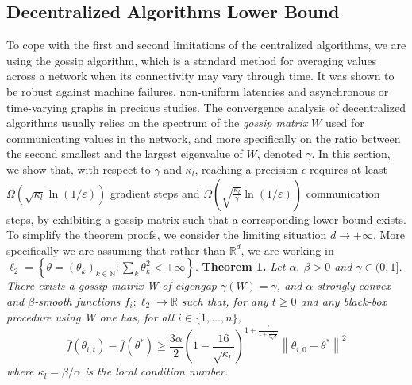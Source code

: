 \documentclass[12pt]{article}
\begin{document}
\subsection{Decentralized Algorithms Lower Bound}
To cope with the first and second limitations of the centralized algorithms, we are using the gossip algorithm, which is a standard method for averaging values across a network when its connectivity may vary through time. It was shown to be robust against machine failures, non-uniform latencies and asynchronous or time-varying graphs in precious studies. 
\newline
\newline
The convergence analysis of decentralized algorithms usually relies on the spectrum of the  \textit{gossip matrix} $W$ used for communicating values in the network, and more specifically on the ratio between the second smallest and the largest eigenvalue of $W$, denoted $\gamma$. In this section, we show that, with respect to $\gamma$ and $\kappa_l$, reaching a precision $\epsilon$ requires at least $\Omega\left(\sqrt{\kappa_{l}} \ln (1 / \varepsilon)\right)$ gradient steps
and $\Omega\left(\sqrt{\frac{\kappa_{l}}{\gamma}} \ln (1 / \varepsilon)\right)$ communication steps, by exhibiting a gossip matrix such that a corresponding lower bound exists.
\newline
\newline
To simplify the theorem proofs, we consider the limiting situation $d \rightarrow+\infty$. More specifically we are assuming that rather than $\mathbb{R}^{d}$, we are working in $\ell_{2}=\left\{\theta=\left(\theta_{k}\right)_{k \in \mathbb{N}} : \sum_{k} \theta_{k}^{2}<+\infty\right\}$. 
\newline
\newline
\newline
\newline
\textbf{Theorem 1.}\textit{
Let $\alpha,\ \beta>0$ and $\gamma\in (0, 1]$. There exists a gossip matrix W of eigengap $\gamma(W) = \gamma$, and $\alpha$-strongly convex and $\beta$-smooth functions $f_{i} : \ell_{2} \rightarrow \mathbb{R}$ such that, for any $t \geq 0$ and any black-box procedure using W one has, for all $i \in\{1, \ldots, n\}$,
$$\overline{f}\left(\theta_{i, t}\right)-\overline{f}\left(\theta^{*}\right) \geq \frac{3 \alpha}{2}\left(1-\frac{16}{\sqrt{\kappa_{l}}}\right)^{1+\frac{t}{1+\frac{\tau}{5 \sqrt{\gamma}}}}\left\|\theta_{i, 0}-\theta^{*}\right\|^{2}$$
where $\kappa_l = \beta/\alpha$ is the local condition number. }
\newline
\end{document}
